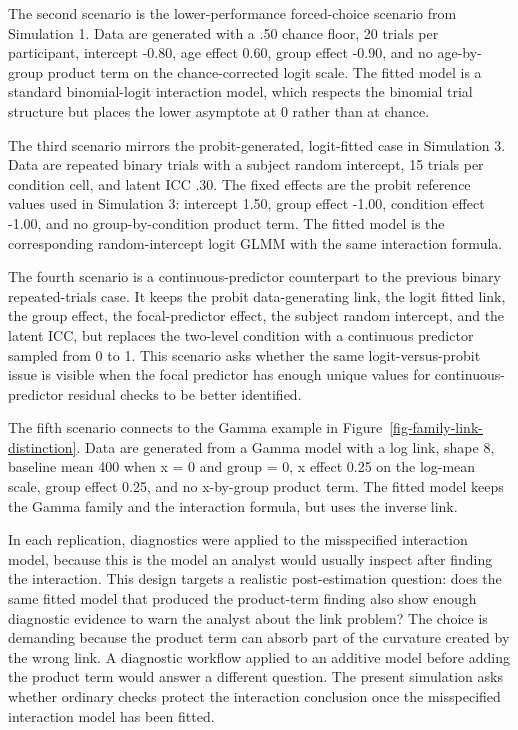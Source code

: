 \documentclass[
  man,
  longtable,
  nolmodern,
  notxfonts,
  notimes,
  colorlinks=true,linkcolor=blue,citecolor=blue,urlcolor=blue]{apa7}
\begin{document}
The second scenario is the lower-performance forced-choice scenario from
Simulation 1. Data are generated with a .50 chance floor, 20 trials per
participant, intercept -0.80, age effect 0.60, group effect -0.90, and
no age-by-group product term on the chance-corrected logit scale. The
fitted model is a standard binomial-logit interaction model, which
respects the binomial trial structure but places the lower asymptote at
0 rather than at chance.

The third scenario mirrors the probit-generated, logit-fitted case in
Simulation 3. Data are repeated binary trials with a subject random
intercept, 15 trials per condition cell, and latent ICC .30. The fixed
effects are the probit reference values used in Simulation 3: intercept
1.50, group effect -1.00, condition effect -1.00, and no
group-by-condition product term. The fitted model is the corresponding
random-intercept logit GLMM with the same interaction formula.

The fourth scenario is a continuous-predictor counterpart to the
previous binary repeated-trials case. It keeps the probit
data-generating link, the logit fitted link, the group effect, the
focal-predictor effect, the subject random intercept, and the latent
ICC, but replaces the two-level condition with a continuous predictor
sampled from 0 to 1. This scenario asks whether the same
logit-versus-probit issue is visible when the focal predictor has enough
unique values for continuous-predictor residual checks to be better
identified.

The fifth scenario connects to the Gamma example in
Figure~\ref{fig-family-link-distinction}. Data are generated from a
Gamma model with a log link, shape 8, baseline mean 400 when x = 0 and
group = 0, x effect 0.25 on the log-mean scale, group effect 0.25, and
no x-by-group product term. The fitted model keeps the Gamma family and
the interaction formula, but uses the inverse link.

In each replication, diagnostics were applied to the misspecified
interaction model, because this is the model an analyst would usually
inspect after finding the interaction. This design targets a realistic
post-estimation question: does the same fitted model that produced the
product-term finding also show enough diagnostic evidence to warn the
analyst about the link problem? The choice is demanding because the
product term can absorb part of the curvature created by the wrong link.
A diagnostic workflow applied to an additive model before adding the
product term would answer a different question. The present simulation
asks whether ordinary checks protect the interaction conclusion once the
misspecified interaction model has been fitted.
\end{document}
